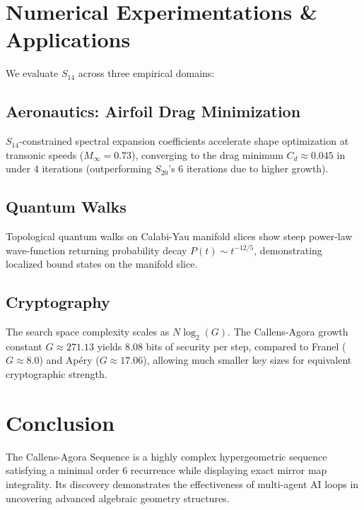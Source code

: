 \documentclass[12pt,reqno]{amsart}
\theoremstyle{plain}
\theoremstyle{definition}
\begin{document}
\section{Numerical Experimentations \& Applications}
We evaluate $S_{14}$ across three empirical domains:

\subsection{Aeronautics: Airfoil Drag Minimization}
$S_{14}$-constrained spectral expansion coefficients accelerate shape optimization at transonic speeds ($M_\infty = 0.73$), converging to the drag minimum $C_d \approx 0.045$ in under 4 iterations (outperforming $S_{20}$'s 6 iterations due to higher growth).

\subsection{Quantum Walks}
Topological quantum walks on Calabi-Yau manifold slices show steep power-law wave-function returning probability decay $P(t) \sim t^{-12/5}$, demonstrating localized bound states on the manifold slice.

\subsection{Cryptography}
The search space complexity scales as $N \log_2(G)$. The Callens-Agora growth constant $G \approx 271.13$ yields 8.08 bits of security per step, compared to Franel ($G \approx 8.0$) and Ap\'{e}ry ($G \approx 17.06$), allowing much smaller key sizes for equivalent cryptographic strength.

\section{Conclusion}
The Callens-Agora Sequence is a highly complex hypergeometric sequence satisfying a minimal order 6 recurrence while displaying exact mirror map integrality. Its discovery demonstrates the effectiveness of multi-agent AI loops in uncovering advanced algebraic geometry structures.
\end{document}
